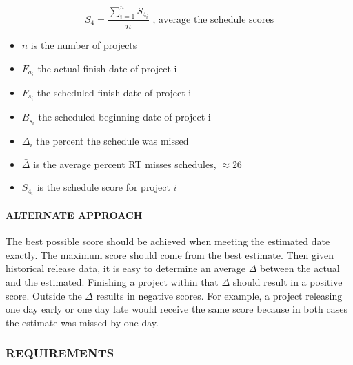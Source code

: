 \documentclass[SDSUThesis.tex]{subfiles}
\begin{document}
                \[
                    S_{4} = \frac{\sum^n_{i=1} S_{4_i}}{n} \text{   , average the schedule scores}
                \]
                \begin{itemize}
                    \item $n$ is the number of projects
                    \item $F_{a_i}$ the actual finish date of project i
                    \item $F_{s_i}$ the scheduled finish date of project i
                    \item $B_{s_i}$ the scheduled beginning date of project i
                    \item $\Delta_i$ the percent the schedule was missed
                    \item $\bar{\Delta}$ is the average percent RT misses schedules, $\approx 26$
                    \item $S_{4_i}$ is the schedule score for project $i$
                \end{itemize}
    
    
            \paragraph{ALTERNATE APPROACH}
                The best possible score should be achieved
                when meeting the estimated date exactly.  The maximum score
                should come from the best estimate.  Then given historical
                release data, it is easy to determine an 
                average $\Delta$ between the actual and the estimated.  
                Finishing a project within that $\Delta$ should result 
                in a positive score.  Outside the $\Delta$ results in
                negative scores.  For example, a project releasing
                one day early or one day late would receive the same score
                because in both cases the estimate was missed by one day.



        \subsubsection{REQUIREMENTS}
            
\end{document}
